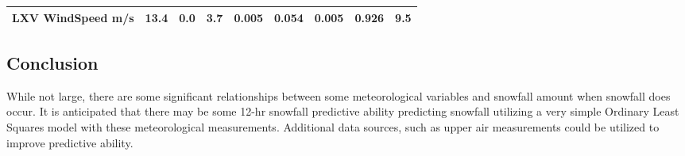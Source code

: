 \documentclass[11pt]{article}
\begin{document}
\begin{longtable}[]{@{}lllllllll@{}}
\begin{minipage}[t]{0.25\columnwidth}
LXV WindSpeed m/s\strut
\end{minipage} & \begin{minipage}[t]{0.06\columnwidth}\raggedright\strut
13.4\strut
\end{minipage} & \begin{minipage}[t]{0.06\columnwidth}\raggedright\strut
0.0\strut
\end{minipage} & \begin{minipage}[t]{0.08\columnwidth}\raggedright\strut
3.7\strut
\end{minipage} & \begin{minipage}[t]{0.05\columnwidth}\raggedright\strut
0.005\strut
\end{minipage} & \begin{minipage}[t]{0.07\columnwidth}\raggedright\strut
0.054\strut
\end{minipage} & \begin{minipage}[t]{0.06\columnwidth}\raggedright\strut
0.005\strut
\end{minipage} & \begin{minipage}[t]{0.06\columnwidth}\raggedright\strut
0.926\strut
\end{minipage} & \begin{minipage}[t]{0.07\columnwidth}\raggedright\strut
9.5\strut
\end{minipage}\tabularnewline
\bottomrule
\end{longtable}

\subsection{Conclusion}\label{conclusion}

While not large, there are some significant relationships between some
meteorological variables and snowfall amount when snowfall does occur.
It is anticipated that there may be some 12-hr snowfall predictive
ability predicting snowfall utilizing a very simple Ordinary Least
Squares model with these meteorological measurements. Additional data
sources, such as upper air measurements could be utilized to improve
predictive ability.


    
    
    
    
\end{document}
